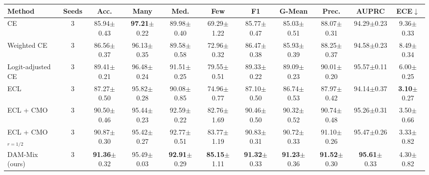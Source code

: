 \begin{tabular}{l c ccccccccc}
\toprule
Method & Seeds & Acc. & Many & Med. & Few & F1 & G-Mean & Prec. & AUPRC & ECE$\downarrow$ \\
\midrule
CE & 3 & 85.94{\scriptsize$\pm$0.43} & \textbf{97.21}{\scriptsize$\pm$0.22} & 89.98{\scriptsize$\pm$0.40} & 69.29{\scriptsize$\pm$1.22} & 85.77{\scriptsize$\pm$0.47} & 85.03{\scriptsize$\pm$0.51} & 88.07{\scriptsize$\pm$0.31} & 94.29{\scriptsize$\pm$0.23} & 9.36{\scriptsize$\pm$0.33} \\
Weighted CE & 3 & 86.56{\scriptsize$\pm$0.37} & 96.13{\scriptsize$\pm$0.35} & 89.58{\scriptsize$\pm$0.58} & 72.96{\scriptsize$\pm$0.32} & 86.47{\scriptsize$\pm$0.38} & 85.93{\scriptsize$\pm$0.39} & 88.25{\scriptsize$\pm$0.37} & 94.58{\scriptsize$\pm$0.23} & 8.49{\scriptsize$\pm$0.34} \\
Logit-adjusted CE & 3 & 89.41{\scriptsize$\pm$0.21} & 96.48{\scriptsize$\pm$0.24} & 91.51{\scriptsize$\pm$0.25} & 79.55{\scriptsize$\pm$0.51} & 89.33{\scriptsize$\pm$0.22} & 89.09{\scriptsize$\pm$0.23} & 90.01{\scriptsize$\pm$0.20} & 95.57{\scriptsize$\pm$0.11} & 6.00{\scriptsize$\pm$0.25} \\
ECL & 3 & 87.27{\scriptsize$\pm$0.50} & 95.82{\scriptsize$\pm$0.28} & 90.08{\scriptsize$\pm$0.85} & 74.96{\scriptsize$\pm$0.77} & 87.10{\scriptsize$\pm$0.50} & 86.74{\scriptsize$\pm$0.53} & 87.97{\scriptsize$\pm$0.42} & 94.14{\scriptsize$\pm$0.37} & \textbf{3.10}{\scriptsize$\pm$0.27} \\
ECL + CMO & 3 & 90.50{\scriptsize$\pm$0.46} & 95.44{\scriptsize$\pm$0.23} & 92.59{\scriptsize$\pm$0.22} & 82.76{\scriptsize$\pm$1.69} & 90.46{\scriptsize$\pm$0.50} & 90.32{\scriptsize$\pm$0.52} & 90.74{\scriptsize$\pm$0.48} & 95.26{\scriptsize$\pm$0.31} & 3.50{\scriptsize$\pm$0.66} \\
ECL + CMO$_{r=1/2}$ & 3 & 90.87{\scriptsize$\pm$0.30} & 95.42{\scriptsize$\pm$0.27} & 92.77{\scriptsize$\pm$0.51} & 83.77{\scriptsize$\pm$1.19} & 90.83{\scriptsize$\pm$0.31} & 90.72{\scriptsize$\pm$0.33} & 91.10{\scriptsize$\pm$0.26} & 95.47{\scriptsize$\pm$0.26} & 3.33{\scriptsize$\pm$0.82} \\
\midrule
DAM-Mix (ours) & 3 & \textbf{91.36}{\scriptsize$\pm$0.32} & 95.49{\scriptsize$\pm$0.03} & \textbf{92.91}{\scriptsize$\pm$0.29} & \textbf{85.15}{\scriptsize$\pm$1.11} & \textbf{91.32}{\scriptsize$\pm$0.33} & \textbf{91.23}{\scriptsize$\pm$0.36} & \textbf{91.52}{\scriptsize$\pm$0.30} & \textbf{95.61}{\scriptsize$\pm$0.33} & 4.30{\scriptsize$\pm$0.82} \\
\bottomrule
\end{tabular}
